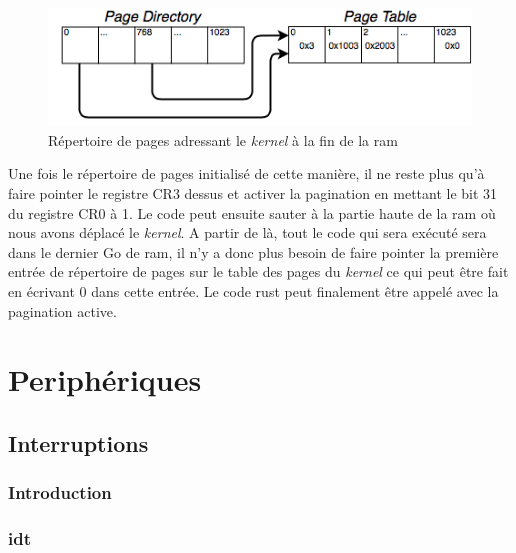 \documentclass[a4paper, 12pt]{article}
\begin{document}
\begin{figure}[!h]
  \centering
  \includegraphics[scale=0.65]{images/high_kern_pd.png}
  \caption{Répertoire de pages adressant le \textit{kernel} à la fin de la \acrshort{ram}}
  \label{high_kern_pd}
\end{figure}

Une fois le répertoire de pages initialisé de cette manière, il ne reste plus
qu'à faire pointer le registre CR3 dessus et activer la pagination en mettant
le bit 31 du registre CR0 à 1. Le code peut ensuite sauter à la partie haute de
la \acrshort{ram} où nous avons déplacé le \textit{kernel}. A partir de là,
tout le code qui sera exécuté sera dans le dernier Go de \acrshort{ram}, il n'y
a donc plus besoin de faire pointer la première entrée de répertoire de pages
sur le table des pages du \textit{kernel} ce qui peut être fait en écrivant 0
dans cette entrée. Le code rust peut finalement être appelé avec la pagination
active.

\newpage

\section{Periphériques}
\subsection{Interruptions}
\subsubsection{Introduction}

\subsubsection{\acrshort{idt}}

\end{document}

